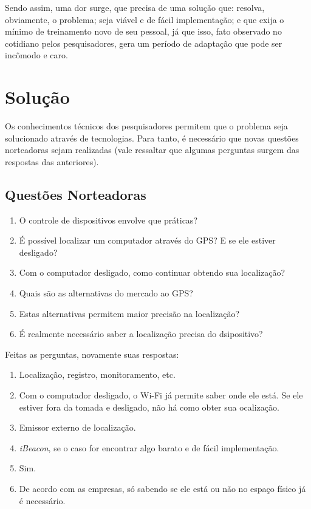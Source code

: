 \documentclass[
	12pt,				%
	openright,			%
	twoside,			%
	a4paper,			%
	english,			%
	french,				%
	spanish,			%
	brazil				%
	]{abntex2}
\begin{document}
Sendo assim, uma dor surge, que precisa de uma solução que: resolva, obviamente, o problema; seja viável e de fácil implementação; e que exija o mínimo de treinamento novo de seu pessoal, já que isso, fato observado no cotidiano pelos pesquisadores, gera um período de adaptação que pode ser incômodo e caro.

\chapter{Solução}

Os conhecimentos técnicos dos pesquisadores permitem que o problema seja solucionado através de tecnologias. Para tanto, é necessário que novas questões norteadoras sejam realizadas (vale ressaltar que algumas perguntas surgem das respostas das anteriores).

\section{Questões Norteadoras}

\begin{enumerate}
    \item O controle de dispositivos envolve que práticas?
    \item É possível localizar um computador através do GPS? E se ele estiver desligado?
    \item Com o computador desligado, como continuar obtendo sua localização?
    \item Quais são as alternativas do mercado ao GPS?
    \item Estas alternativas permitem maior precisão na localização?
    \item É realmente necessário saber a localização precisa do dsipositivo?
\end{enumerate}

Feitas as perguntas, novamente suas respostas:

\begin{enumerate}
    \item Localização, registro, monitoramento, etc.
    \item Com o computador desligado, o Wi-Fi já permite saber onde ele está. Se ele estiver fora da tomada e desligado, não há como obter sua ocalização.
    \item Emissor externo de localização.
    \item \emph{iBeacon}, se o caso for encontrar algo barato e de fácil implementação.
    \item Sim.
    \item De acordo com as empresas, só sabendo se ele está ou não no espaço físico já é necessário.
\end{enumerate}
\end{document}
